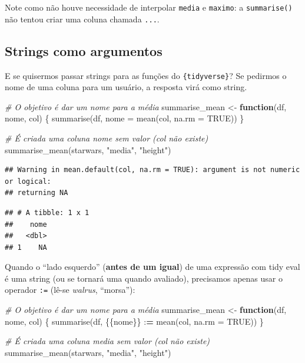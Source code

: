 \documentclass[
]{book}
\newenvironment{Shaded}{\begin{snugshade}}{\end{snugshade}}
\newcommand{\AttributeTok}[1]{\textcolor[rgb]{0.77,0.63,0.00}{#1}}
\newcommand{\CommentTok}[1]{\textcolor[rgb]{0.56,0.35,0.01}{\textit{#1}}}
\newcommand{\ConstantTok}[1]{\textcolor[rgb]{0.00,0.00,0.00}{#1}}
\newcommand{\ControlFlowTok}[1]{\textcolor[rgb]{0.13,0.29,0.53}{\textbf{#1}}}
\newcommand{\ErrorTok}[1]{\textcolor[rgb]{0.64,0.00,0.00}{\textbf{#1}}}
\newcommand{\FunctionTok}[1]{\textcolor[rgb]{0.00,0.00,0.00}{#1}}
\newcommand{\NormalTok}[1]{#1}
\newcommand{\OtherTok}[1]{\textcolor[rgb]{0.56,0.35,0.01}{#1}}
\newcommand{\SpecialCharTok}[1]{\textcolor[rgb]{0.00,0.00,0.00}{#1}}
\newcommand{\StringTok}[1]{\textcolor[rgb]{0.31,0.60,0.02}{#1}}
\begin{document}
Note como não houve necessidade de interpolar \texttt{media} e \texttt{maximo}: a
\texttt{summarise()} não tentou criar uma coluna chamada \texttt{...}.

\hypertarget{strings-como-argumentos}{%
\subsection{Strings como argumentos}\label{strings-como-argumentos}}

E se quisermos passar strings para as funções do \texttt{\{tidyverse\}}? Se pedirmos o nome de uma coluna para um usuário, a resposta virá como string.

\begin{Shaded}
\begin{Highlighting}[]
\CommentTok{\# O objetivo é dar um nome para a média}
\NormalTok{summarise\_mean }\OtherTok{\textless{}{-}} \ControlFlowTok{function}\NormalTok{(df, nome, col) \{}
  \FunctionTok{summarise}\NormalTok{(df, }\AttributeTok{nome =} \FunctionTok{mean}\NormalTok{(col, }\AttributeTok{na.rm =} \ConstantTok{TRUE}\NormalTok{))}
\NormalTok{\}}

\CommentTok{\# É criada uma coluna \textquotesingle{}nome\textquotesingle{} sem valor (\textquotesingle{}col\textquotesingle{} não existe)}
\FunctionTok{summarise\_mean}\NormalTok{(starwars, }\StringTok{"media"}\NormalTok{, }\StringTok{"height"}\NormalTok{)}
\end{Highlighting}
\end{Shaded}

\begin{verbatim}
## Warning in mean.default(col, na.rm = TRUE): argument is not numeric or logical:
## returning NA
\end{verbatim}

\begin{verbatim}
## # A tibble: 1 x 1
##    nome
##   <dbl>
## 1    NA
\end{verbatim}

Quando o ``lado esquerdo'' (\textbf{antes de um igual}) de uma expressão com tidy eval é uma string (ou se tornará uma quando avaliado), precisamos apenas usar o operador \texttt{:=} (lê-se \emph{walrus}, ``morsa''):

\begin{Shaded}
\begin{Highlighting}[]
\CommentTok{\# O objetivo é dar um nome para a média}
\NormalTok{summarise\_mean }\OtherTok{\textless{}{-}} \ControlFlowTok{function}\NormalTok{(df, nome, col) \{}
  \FunctionTok{summarise}\NormalTok{(df, \{\{nome\}\} }\SpecialCharTok{:}\ErrorTok{=} \FunctionTok{mean}\NormalTok{(col, }\AttributeTok{na.rm =} \ConstantTok{TRUE}\NormalTok{))}
\NormalTok{\}}

\CommentTok{\# É criada uma coluna \textquotesingle{}media\textquotesingle{} sem valor (\textquotesingle{}col\textquotesingle{} não existe)}
\FunctionTok{summarise\_mean}\NormalTok{(starwars, }\StringTok{"media"}\NormalTok{, }\StringTok{"height"}\NormalTok{)}
\end{Highlighting}
\end{Shaded}
\end{document}

